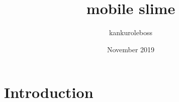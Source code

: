 \documentclass{article}
\title{mobile slime}
\author{kankuroleboss }
\date{November 2019}
\begin{document}
\maketitle

\section{Introduction}
\end{document}
